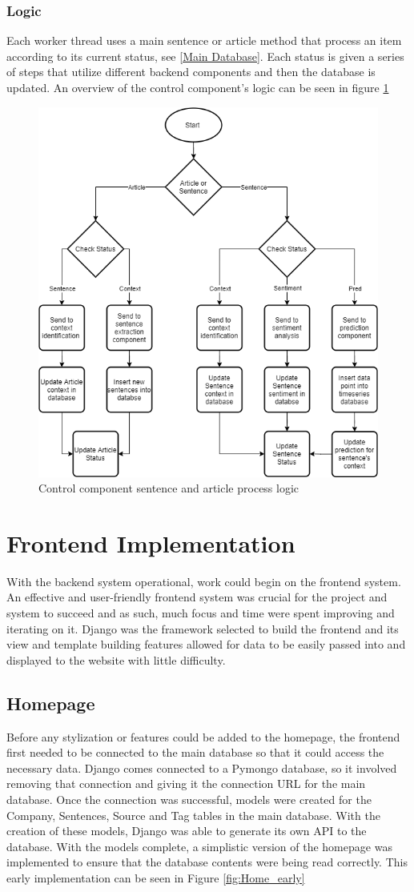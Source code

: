             \subsubsection{Logic}
            Each worker thread uses a main sentence or article method that process an item according to its current status, see \ref{Main Database}. Each status is given a series of steps that utilize different backend components and then the database is updated. An overview of the control component’s logic can be seen in figure \ref{fig:control_logic} 
            
            \begin{figure}[!h]
                \centering
                \includegraphics[width=0.4\linewidth]{images/upload/Logic Diagram.png}    
                \caption{Control component sentence and article process logic}
                \label{fig:control_logic}
            \end{figure}
            
    \section{Frontend Implementation}
    With the backend system operational, work could begin on the frontend system. An effective and user-friendly frontend system was crucial for the project and system to succeed and as such, much focus and time were spent improving and iterating on it. Django \citep{technology:Django} was the framework selected to build the frontend and its view and template building features allowed for data to be easily passed into and displayed to the website with little difficulty. 
    
        \subsection{Homepage}
        Before any stylization or features could be added to the homepage, the frontend first needed to be connected to the main database so that it could access the necessary data. Django comes connected to a Pymongo database, so it involved removing that connection and giving it the connection URL for the main database. Once the connection was successful, models were created for the Company, Sentences, Source and Tag tables in the main database. With the creation of these models, Django was able to generate its own API to the database. With the models complete, a simplistic version of the homepage was implemented to ensure that the database contents were being read correctly. This early implementation can be seen in Figure \ref{fig:Home_early}
            
